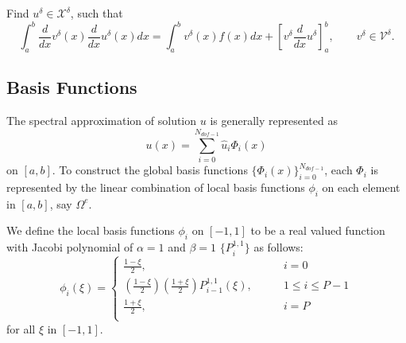 Find $u^{\delta} \in \mathcal{X}^{\delta}$, such that
\begin{equation}
\int_a^b \frac{d}{dx}v^{\delta}(x)\frac{d}{dx}u^{\delta}(x)dx = \int_a^b v^{\delta}(x) f(x) dx + \left[v^{\delta} \frac{d}{dx}u^{\delta}\right]_a^b, \qquad v^{\delta} \in \mathcal{V}^{\delta}.
\end{equation}






\subsection{Basis Functions}

The spectral approximation of solution $u$ is generally represented as
\begin{equation}\label{genrep}
u(x) = \sum_{i=0}^{N_{dof-1}} \hat u_i\Phi_i(x)
\end{equation}
on $[a, b]$. To construct the global basis functions $\{\Phi_i(x)\}_{i=0}^{N_{dof-1}}$, each $\Phi_i$ is represented by the linear combination of local basis functions $\phi_i$ on each element in $[a, b]$, say $\Omega^e$.

We define the local basis functions ${\phi_i}$ on $[-1, 1]$ to be a real valued function with Jacobi polynomial of $\alpha = 1$ and $\beta = 1$ $\{P_i^{1,1}\}$ as follows:
\begin{equation}
\label{locbasis}
  \phi_i(\xi) =\left \{
    \begin{array}{ll}
    \frac{1-\xi}{2}, & i=0 \\
    \left(\frac{1-\xi}{2}\right)\left(\frac{1+\xi}{2}\right)P_{i-1}^{1,1}(\xi),
    \qquad &1 \le i \le P-1 \\
    \frac{1+\xi}{2}, & i=P \\
    \end{array}   \right.
\end{equation}
for all $\xi$ in $[-1, 1]$.

